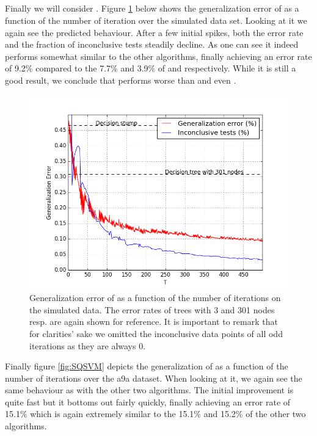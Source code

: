 \subsection{\squintB}
\label{subsec:sqPracPerf}
Finally we will consider \squintB. Figure \ref{fig:SQGD} below shows the generalization error of \squintB as a function of the number of iteration over the simulated data set. Looking at it we again see the predicted behaviour. After a few initial spikes, both the error rate and the fraction of inconclusive tests steadily decline. As one can see it indeed performs somewhat similar to the other algorithms, finally achieving an error rate of 9.2\% compared to the 7.7\% and 3.9\% of \adaB and \NHB respectively. While it is still a good result, we conclude that \squintB performs worse than  \NHB and even \adaB. 
\begin{figure}[!ht]
  \centering
     \includegraphics[width=\graphWidth]{generated/SQGD.png}
  \caption{Generalization error of \squintB as a function of the number of iterations on the simulated data. The error rates of trees with 3 and 301 nodes resp. are again shown for reference. It is important to remark that for clarities' sake we omitted the inconclusive data points of all odd iterations as they are always 0.}
      \label{fig:SQGD}
\end{figure}

\par Finally figure \ref{fig:SQSVM} depicts the generalization of \squintB as a function of the number of iterations over the a9a dataset. When looking at it, we again see the same behaviour as with the other two algorithms. The initial improvement is quite fast but it bottoms out fairly quickly, finally achieving an error rate of 15.1\% which is again extremely similar to the 15.1\% and 15.2\% of the other two algorithms. 


